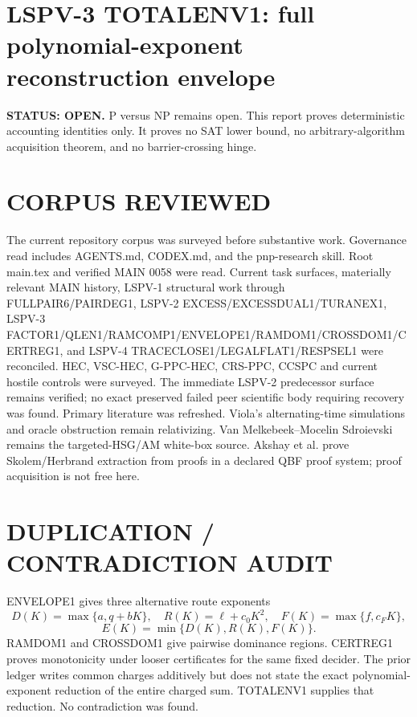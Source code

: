 \documentclass[11pt]{article}
\begin{document}
\section*{LSPV-3 TOTALENV1: full polynomial-exponent reconstruction envelope}
\textbf{STATUS: OPEN.} P versus NP remains open. This report proves deterministic accounting identities only. It proves no SAT lower bound, no arbitrary-algorithm acquisition theorem, and no barrier-crossing hinge.
\section*{CORPUS REVIEWED}
The current repository corpus was surveyed before substantive work. Governance read includes AGENTS.md, CODEX.md, and the pnp-research skill. Root main.tex and verified MAIN 0058 were read. Current task surfaces, materially relevant MAIN history, LSPV-1 structural work through FULLPAIR6/PAIRDEG1, LSPV-2 EXCESS/EXCESSDUAL1/TURANEX1, LSPV-3 FACTOR1/QLEN1/RAMCOMP1/ENVELOPE1/RAMDOM1/CROSSDOM1/CERTREG1, and LSPV-4 TRACECLOSE1/LEGALFLAT1/RESPSEL1 were reconciled. HEC, VSC-HEC, G-PPC-HEC, CRS-PPC, CCSPC and current hostile controls were surveyed. The immediate LSPV-2 predecessor surface remains verified; no exact preserved failed peer scientific body requiring recovery was found.
Primary literature was refreshed. Viola's alternating-time simulations and oracle obstruction remain relativizing. Van Melkebeek--Mocelin Sdroievski remains the targeted-HSG/AM white-box source. Akshay et al. prove Skolem/Herbrand extraction from proofs in a declared QBF proof system; proof acquisition is not free here.
\section*{DUPLICATION / CONTRADICTION AUDIT}
ENVELOPE1 gives three alternative route exponents
\[D(K)=\max\{a,q+bK\},\quad R(K)=\ell+c_0K^2,\quad F(K)=\max\{f,c_FK\},\]
\[E(K)=\min\{D(K),R(K),F(K)\}.\]
RAMDOM1 and CROSSDOM1 give pairwise dominance regions. CERTREG1 proves monotonicity under looser certificates for the same fixed decider. The prior ledger writes common charges additively but does not state the exact polynomial-exponent reduction of the entire charged sum. TOTALENV1 supplies that reduction. No contradiction was found.
\end{document}
